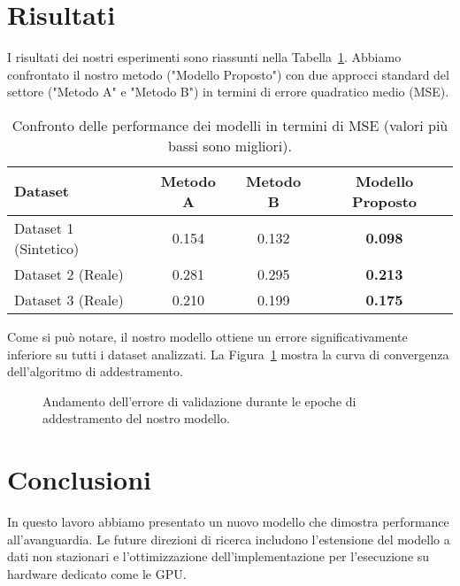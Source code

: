 \documentclass[a4paper, 11pt]{article}
\begin{document}
\section{Risultati}
I risultati dei nostri esperimenti sono riassunti nella Tabella~\ref{tab:risultati}. Abbiamo confrontato il nostro metodo ("Modello Proposto") con due approcci standard del settore ("Metodo A" e "Metodo B") in termini di errore quadratico medio (MSE).

\begin{table}[h!]
\centering
\caption{Confronto delle performance dei modelli in termini di MSE (valori più bassi sono migliori).}
\label{tab:risultati}
\begin{tabular}{@{}lccc@{}}
\toprule
\textbf{Dataset} & \textbf{Metodo A} & \textbf{Metodo B} & \textbf{Modello Proposto} \\
\midrule
Dataset 1 (Sintetico) & 0.154 & 0.132 & \textbf{0.098} \\
Dataset 2 (Reale)     & 0.281 & 0.295 & \textbf{0.213} \\
Dataset 3 (Reale)     & 0.210 & 0.199 & \textbf{0.175} \\
\bottomrule
\end{tabular}
\end{table}

Come si può notare, il nostro modello ottiene un errore significativamente inferiore su tutti i dataset analizzati. La Figura~\ref{fig:convergenza} mostra la curva di convergenza dell'algoritmo di addestramento.

\begin{figure}[h!]
    \centering
    \caption{Andamento dell'errore di validazione durante le epoche di addestramento del nostro modello.}
    \label{fig:convergenza}
\end{figure}

\lipsum[4]

\section{Conclusioni}
In questo lavoro abbiamo presentato un nuovo modello che dimostra performance all'avanguardia. Le future direzioni di ricerca includono l'estensione del modello a dati non stazionari e l'ottimizzazione dell'implementazione per l'esecuzione su hardware dedicato come le GPU.

 

 
\end{document}
